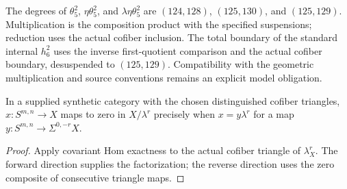 \begin{definition}
  \label{def:actual-theta5-expressions}
  \leanok
  The degrees of $\theta_5^2$, $\eta\theta_5^2$, and $\lambda\eta\theta_5^2$
  are $(124,128)$, $(125,130)$, and $(125,129)$.
  Multiplication is the composition product with the specified suspensions;
  reduction uses the actual cofiber inclusion. The total boundary of the
  standard internal $h_6^2$ uses the inverse first-quotient comparison and
  the actual cofiber boundary, desuspended to $(125,129)$.
  Compatibility with the geometric multiplication and source conventions
  remains an explicit model obligation.
\end{definition}

\begin{lemma}
  \label{lem:actual-quotient-zero-factorization}
  \leanok
  In a supplied synthetic category with the chosen distinguished cofiber
  triangles, $x:S^{m,n}\to X$ maps to zero in $X/\lambda^r$ precisely when
  $x=y\lambda^r$ for a map $y:S^{m,n}\to\Sigma^{0,-r}X$.
\end{lemma}
\begin{proof}
  Apply covariant Hom exactness to the actual cofiber triangle of
  $\lambda^r_X$. The forward direction supplies the factorization; the
  reverse direction uses the zero composite of consecutive triangle maps.
  \leanok
\end{proof}

